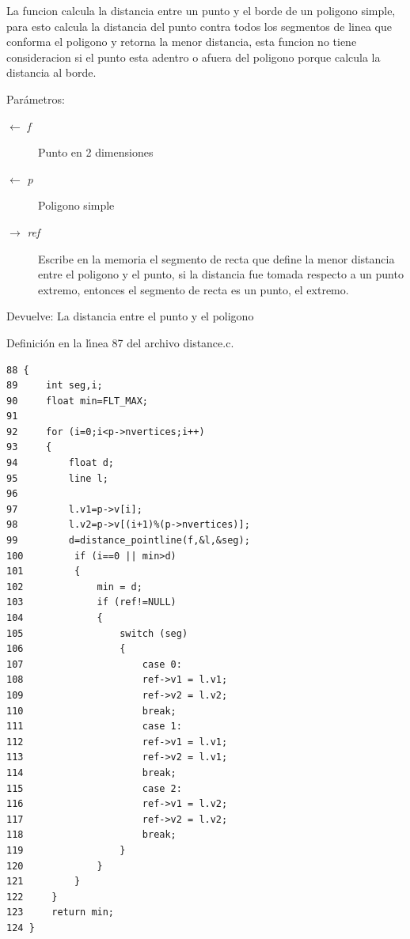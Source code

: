 La funcion calcula la distancia entre un punto y el borde de un poligono simple, para esto calcula la distancia del punto contra todos los segmentos de linea que conforma el poligono y retorna la menor distancia, esta funcion no tiene consideracion si el punto esta adentro o afuera del poligono porque calcula la distancia al borde.

\begin{Desc}
\item[Par\'{a}metros:]
\begin{description}
\item[\mbox{$\leftarrow$} {\em f}]Punto en 2 dimensiones \item[\mbox{$\leftarrow$} {\em p}]Poligono simple \item[\mbox{$\rightarrow$} {\em ref}]Escribe en la memoria el segmento de recta que define la menor distancia entre el poligono y el punto, si la distancia fue tomada respecto a un punto extremo, entonces el segmento de recta es un punto, el extremo. \end{description}
\end{Desc}
\begin{Desc}
\item[Devuelve:]La distancia entre el punto y el poligono \end{Desc}


Definici\'{o}n en la l\'{\i}nea 87 del archivo distance.c.

\begin{Code}\begin{verbatim}88 {
89     int seg,i;
90     float min=FLT_MAX;
91 
92     for (i=0;i<p->nvertices;i++)
93     {
94         float d;
95         line l;
96 
97         l.v1=p->v[i];
98         l.v2=p->v[(i+1)%(p->nvertices)];
99         d=distance_pointline(f,&l,&seg);
100         if (i==0 || min>d)
101         {
102             min = d;
103             if (ref!=NULL)
104             {
105                 switch (seg)
106                 {
107                     case 0:
108                     ref->v1 = l.v1;
109                     ref->v2 = l.v2;
110                     break;
111                     case 1:
112                     ref->v1 = l.v1;
113                     ref->v2 = l.v1;
114                     break;
115                     case 2:
116                     ref->v1 = l.v2;
117                     ref->v2 = l.v2;
118                     break;
119                 }
120             }
121         }
122     }
123     return min;
124 }
\end{verbatim}\end{Code}




